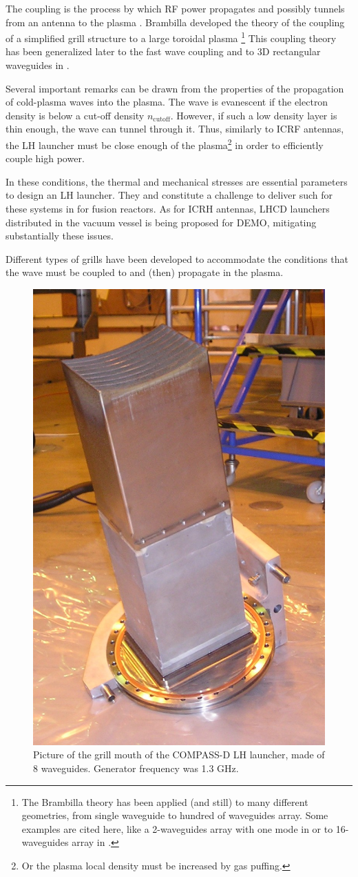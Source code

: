 The coupling is the process by which RF power propagates and possibly tunnels from an antenna to the plasma \parencite{Meneghini2012}. Brambilla developed the theory of the coupling of  a simplified grill structure to a large toroidal plasma \parencite{Brambilla1979} \footnote{The Brambilla theory has been applied (and still) to many different geometries, from single waveguide to hundred of waveguides array. Some examples are cited here, like a 2-waveguides array with one mode in \parencite{Krapchev1978} or to 16-waveguides array in \parencite{Stevens1988}.} This coupling theory has been generalized later to the fast wave coupling \parencite{Theilhaber1979,Theilhaber1980} and to 3D rectangular waveguides in \parencite{Bers1981, Bers1983}. 

Several important remarks can be drawn from the properties of the propagation of cold-plasma waves into the plasma. The wave is evanescent if the electron density is below a cut-off density $n_{\mathrm{cutoff}}$. However, if such a low density layer is thin enough, the wave can tunnel through it. Thus, similarly to ICRF antennas, the LH launcher must be close enough of the plasma\footnote{Or the plasma local density must be increased by gas puffing.} in order to efficiently couple high power. 

In these conditions, the thermal and mechanical stresses are essential parameters to design an LH launcher. They and constitute a challenge to deliver such for these systems in for fusion reactors. As for ICRH antennas, LHCD launchers distributed in the vacuum vessel is being proposed for DEMO, mitigating substantially these issues.

Different types of grills have been developed to accommodate the conditions that the wave must be coupled to and (then) propagate in the plasma. 

\begin{figure}
\centering
\includegraphics[width=0.4\linewidth]{Figures/LHCD/COMPASS_grill_out}
\caption{Picture of the grill mouth of the COMPASS-D LH launcher, made of 8 waveguides. Generator frequency was 1.3 GHz.}
\label{fig:compassgrillout}
\end{figure}

